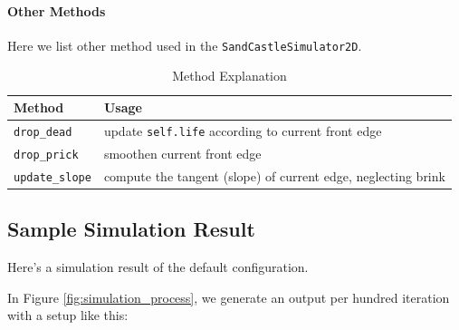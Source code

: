\documentclass[12pt]{article}
\begin{document}
\paragraph{Other Methods}
Here we list other method used in the \texttt{SandCastleSimulator2D}.
\begin{table}[H]
    \caption{Method Explanation}
    \vspace{20pt}
    \centering
    \begin{tabular}{p{3cm}p{12cm}}
        \hline
        \textbf{Method}        & \textbf{Usage}                                                \\
        \hline
        \texttt{drop\_dead}    & update \texttt{self.life} according to current front edge     \\
        \texttt{drop\_prick}   & smoothen current front edge                                   \\
        \texttt{update\_slope} & compute the tangent (slope) of current edge, neglecting brink \\
        \hline
    \end{tabular}
    \label{tab:method_explanation}
\end{table}

\subsection{Sample Simulation Result}
Here's a simulation result of the default configuration.



\par
In Figure \ref{fig:simulation_process}, we generate an output per hundred iteration with a setup like this:
\end{document}
